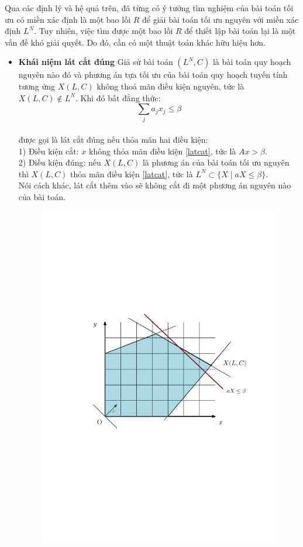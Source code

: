 \documentclass[12pt,a4paper]{report}
\begin{document}
Qua các định lý và hệ quả trên, đã từng có ý tưởng tìm nghiệm của bài toán tối ưu có miền xác định là một bao lồi $R$ để giải bài toán tối ưu nguyên với miền xác định $L^N$. Tuy nhiên, việc tìm được một bao lồi $R$ để thiết lập bài toán lại là một vấn đề khó giải quyết. Do đó, cần có một thuật toán khác hữu hiệu hơn.\\ 
\begin{itemize}
    \item \textbf{Khái niệm lát cắt đúng}
    Giả sử bài toán $(L^N,C)$ là bài toán quy hoạch nguyên nào đó và phương án tựa tối 
ưu của bài toán quy hoạch tuyến tính tương ứng $X(L,C)$ không thoả mãn điều kiện 
nguyên, tức là $X(L,C) \notin  L^N$. Khi đó bất đẳng thức:
    $$\sum _j a_jx_j \le \beta$$\label{latcat}\\
    được gọi là lát cắt đúng nếu thỏa mãn hai điều kiện:\\
    1) Điều kiện cắt: $x$ không thỏa mãn điều kiện \eqref{latcat}, tức là $Ax > \beta$.\\
    2) Điều kiện đúng: nếu $X(L,C)$ là phương án của bài toán tối ưu nguyên thì $X(L,C)$ thỏa mãn điều kiện \eqref{latcat}, tức là 
 $L^N \subset \{X\mid aX\le \beta\}$.\\
    Nói cách khác, lát cắt thêm vào sẽ không cắt đi một phương án nguyên nào của bài toán.\\
    
    
    \begin{figure}[h]
        \centering
        \includegraphics[width=0.8\linewidth]{anh2.pdf}
       

\end{figure}
\end{itemize}
\end{document}
